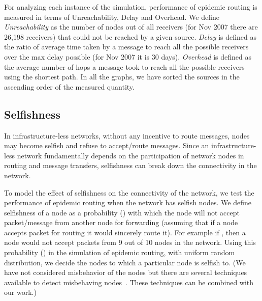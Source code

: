 \documentclass[10pt,conference]{IEEEtran}
\begin{document}
For analyzing each instance of the simulation, performance of epidemic routing is measured in terms of Unreachability, Delay and Overhead. We define \textit{Unreachability}  as the number of nodes out of all receivers (for Nov 2007 there are 26,198 receivers) that could not be reached  by a given source. \textit{Delay} is defined as the ratio of average time taken by a message to reach all the possible receivers over the max delay possible (for Nov 2007 it is 30 days). \textit{Overhead} is defined as the average number of hops a message took to reach all the possible receivers using the shortest path. In all the graphs, we have sorted the sources in the ascending order of the measured quantity. 

\subsection{Selfishness}


In  infrastructure-less networks, without any incentive to route messages, nodes may become selfish and refuse to accept/route messages. Since an infrastructure-less network fundamentally depends on the participation of network nodes in routing and message transfers, selfishness can break down the connectivity in the network. 

To model the effect of selfishness on the connectivity of the network, we test the performance of epidemic routing when the network has selfish nodes. We define selfishness of a node as a probability () with which the node will not accept packet/message from another node for forwarding (assuming that if a node accepts packet for routing it would sincerely route it). For example if , then a node would not accept packets from 9 out of 10 nodes in the network. Using this probability () in the simulation of epidemic routing, with uniform random distribution, we decide the nodes to which a particular node is selfish to. (We have not considered misbehavior of the nodes but there are several techniques available to detect misbehaving nodes~\cite{Marti00mitigatingrouting,locationcentricisolation}. These techniques can be combined with our work.)
\end{document}

